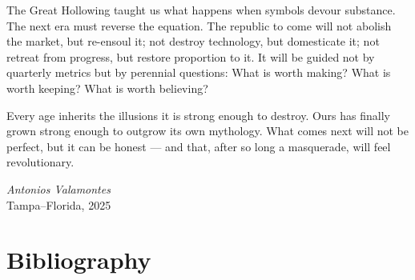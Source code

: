 \documentclass[11pt,twoside]{book}
\begin{document}
The Great Hollowing taught us what happens when symbols devour substance.  
The next era must reverse the equation.  The republic to come will not abolish the market, but re-ensoul it; not destroy technology, but domesticate it; not retreat from progress, but restore proportion to it.  It will be guided not by quarterly metrics but by perennial questions: What is worth making? What is worth keeping? What is worth believing?

Every age inherits the illusions it is strong enough to destroy.  Ours has finally grown strong enough to outgrow its own mythology.  What comes next will not be perfect, but it can be honest — and that, after so long a masquerade, will feel revolutionary.

\vspace{2em}
\begin{flushright}
\textit{Antonios Valamontes}\\
Tampa–Florida, 2025
\end{flushright}

%
%

\chapter*{Bibliography}
\end{document}
